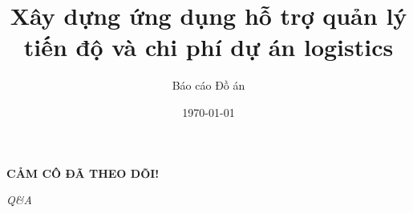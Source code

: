 \documentclass[aspectratio=169]{beamer}
\title{Xây dựng ứng dụng hỗ trợ quản lý tiến độ và chi phí dự án logistics}
\author{Báo cáo Đồ án}
\date{\today}
\begin{document}
\begin{frame}
    \titlepage
\end{frame}










\begin{frame}
    \centering
    \Huge \textbf{CẢM CÔ ĐÃ THEO DÕI!}
    
    \vspace{1cm}
    \Large \textit{Q\&A}
\end{frame}
\end{document}
